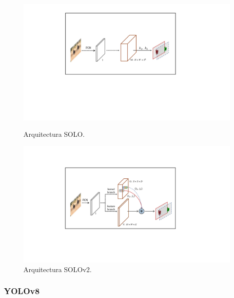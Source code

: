 \begin{figure}[htbp]
    \centering
    \begin{minipage}[b]{0.48\textwidth}
        \centering
        \includegraphics[width=1\textwidth]{figures/Model SOLOv1.pdf}
        \caption[Arquitectura SOLO]{Arquitectura SOLO.}
    \end{minipage}
    \hfill
    \begin{minipage}[b]{0.48\textwidth}
        \centering
        \includegraphics[width=1\textwidth]{figures/Model SOLOv2.pdf}
        \caption[Arquitectura SOLOv2]{Arquitectura SOLOv2.}
    \end{minipage}
\end{figure}

\subsubsection{YOLOv8}

